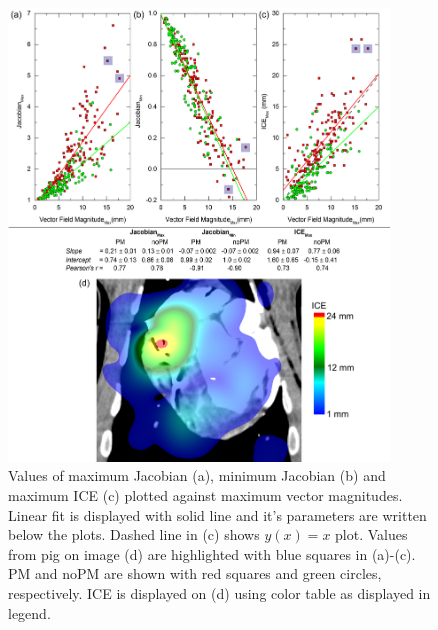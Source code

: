 \documentclass[type=dr, dr=rernat, accentcolor=tud7b,colorbacktitle, bigchapter, openright, twoside, 12pt ]{tudthesis}
\begin{document}

\begin{figure}[H]
	\begin{center}		
		\includegraphics[width=0.9\textwidth]{./Images/MaxVfdata_pigs.png}
		\caption{Values of maximum Jacobian (a), minimum Jacobian (b) and maximum ICE (c) plotted against maximum vector magnitudes. Linear fit is displayed with solid line and it's parameters are written below the plots. Dashed line in (c) shows $y(x)= x$ plot. Values from pig on image (d) are highlighted with blue squares in (a)-(c). PM and noPM are shown with red squares and green circles, respectively.
			ICE is displayed on (d) using color table as displayed in legend.}
		\label{maxvf_pigs}
	\end{center}
\end{figure}
\end{document}
